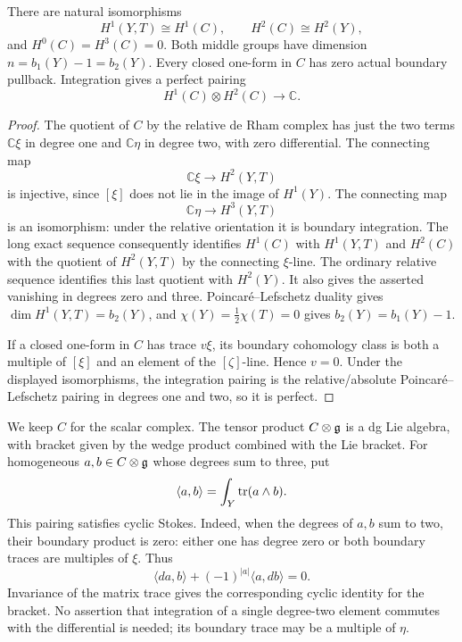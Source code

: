\begin{lemma}
\label{lem:edge-cohomology}
There are natural isomorphisms
\[
 H^1(Y,T)\cong H^1(C),\qquad H^2(C)\cong H^2(Y),
\]
and $H^0(C)=H^3(C)=0$.  Both middle groups have dimension
$n=b_1(Y)-1=b_2(Y)$.  Every closed one-form in $C$ has zero actual
boundary pullback.  Integration gives a perfect pairing
\[
 H^1(C)\otimes H^2(C)\longrightarrow\mathbb C.
\]
\end{lemma}

\begin{proof}
The quotient of $C$ by the relative de Rham complex has just the two
terms $\mathbb C\xi$ in degree one and $\mathbb C\eta$ in degree two,
with zero differential.  The connecting map
\[
 \mathbb C\xi\longrightarrow H^2(Y,T)
\]
is injective, since $[\xi]$ does not lie in the image of $H^1(Y)$.
The connecting map
\[
 \mathbb C\eta\longrightarrow H^3(Y,T)
\]
is an isomorphism: under the relative orientation it is boundary
integration.  The long exact sequence consequently identifies $H^1(C)$
with $H^1(Y,T)$ and $H^2(C)$ with the quotient of $H^2(Y,T)$ by the
connecting $\xi$-line.  The ordinary relative sequence identifies this
last quotient with $H^2(Y)$.  It also gives the asserted vanishing in
degrees zero and three.  Poincar\'e--Lefschetz duality gives
$\dim H^1(Y,T)=b_2(Y)$, and
$\chi(Y)=\tfrac12\chi(T)=0$ gives $b_2(Y)=b_1(Y)-1$.

If a closed one-form in $C$ has trace $v\xi$, its boundary cohomology
class is both a multiple of $[\xi]$ and an element of the $[\zeta]$-line.
Hence $v=0$.  Under the displayed isomorphisms, the integration pairing
is the relative/absolute Poincar\'e--Lefschetz pairing in degrees one
and two, so it is perfect.
\end{proof}

We keep $C$ for the scalar complex.  The tensor product $C\otimes\mathfrak{g}$
is a dg Lie algebra, with bracket given by the wedge product combined
with the Lie bracket.  For homogeneous $a,b\in C\otimes\mathfrak{g}$ whose
degrees sum to three, put
\[
 \langle a,b\rangle=\int_Y\operatorname{tr}(a\wedge b).
\]
This pairing satisfies cyclic Stokes.  Indeed, when the degrees of
$a,b$ sum to two, their boundary product is zero: either one has degree
zero or both boundary traces are multiples of $\xi$.  Thus
\begin{equation}
\label{eq:edge-cyclic-stokes}
 \langle da,b\rangle+(-1)^{|a|}\langle a,db\rangle=0.
\end{equation}
Invariance of the matrix trace gives the corresponding cyclic identity
for the bracket.  No assertion that integration of a single
degree-two element commutes with the differential is needed; its
boundary trace may be a multiple of $\eta$.

